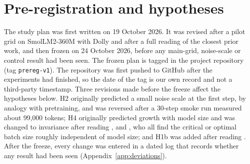 \documentclass[10pt]{article}
\begin{document}
\section{Pre-registration and hypotheses}\label{sec:prereg}

The study plan was first written on 19 October 2026. It was revised after a pilot grid on SmolLM2-360M with Dolly and after a full reading of the closest prior work, and then frozen on 24 October 2026, before any main-grid, noise-scale or control result had been seen. The frozen plan is tagged in the project repository (tag \texttt{prereg-v1}). The repository was first pushed to GitHub after the experiments had finished, so the date of the tag is our own record and not a third-party timestamp. Three revisions made before the freeze affect the hypotheses below. H2 originally predicted a small noise scale at the first step, by analogy with pretraining, and was reversed after a 30-step smoke run measured about 99,000 tokens; H4 originally predicted growth with model size and was changed to invariance after reading \citet{zhang2025cbs}, \citet{merrill2025} and \citet{lee2026}, who all find the critical or optimal batch size roughly independent of model size; and H1b was added after reading \citet{li2024surge}. After the freeze, every change was entered in a dated log that records whether any result had been seen (Appendix~\ref{app:deviations}).
\end{document}
